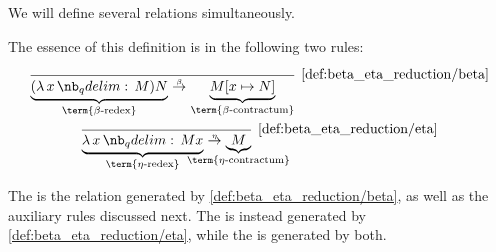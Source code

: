 \begin{definition}\label{def:beta_eta_reduction}
  We will define several relations simultaneously.
  \begin{thmenum}
     The essence of this definition is in the following two rules:
    \begin{TwoColumns}
      \begin{equation*}\taglabel[\ensuremath{ \logic{Red}_\beta }]{def:beta_eta_reduction/beta}
        \begin{prooftree}
          \infer0[\ref{def:beta_eta_reduction/beta}]{ \underbrace{(\qabs x M) N}_{\T{\term{\( \beta \)-redex}}} \bred \underbrace{M[x \mapsto N]}_{\T{\term{\( \beta \)-contractum}}} }.
        \end{prooftree}
      \end{equation*}
    \BeginSecondColumn
      \begin{equation*}\taglabel[\ensuremath{ \logic{Red}_\eta }]{def:beta_eta_reduction/eta}
        \begin{prooftree}
          \infer0[\ref{def:beta_eta_reduction/eta}]{ \underbrace{\qabs x M x}_{\T{\term{\( \eta \)-redex}}} \ered \underbrace{M}_{\mathclap{\T{\term{\( \eta \)-contractum}}}} }.
        \end{prooftree}
      \end{equation*}
    \end{TwoColumns}

    The  is the relation generated by \ref{def:beta_eta_reduction/beta}, as well as the auxiliary rules discussed next. The  is instead generated by \ref{def:beta_eta_reduction/eta}, while the  is generated by both.


\end{thmenum}
\end{definition}
